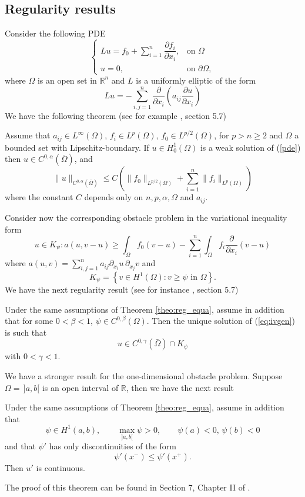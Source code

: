   \subsection*{Regularity results}
 Consider the following PDE
 \begin{equation}\label{pde}
 \begin{cases}
 Lu= f_0+\sum_{i=1}^n \dfrac{\partial f_i}{\partial x_i},& \text{on } \Omega\\
 u=0, & \text{on } \partial \Omega,
 \end{cases}
 \end{equation}
where $\Omega$ is an open set in $\mathbb{R}^n$ and $L$ is a uniformly elliptic of the form
$$
Lu=-\sum_{i,j=1}^n \dfrac{\partial }{\partial x_i}\left(a_{ij}\dfrac{\partial u}{\partial x_i}\right)
$$
We have the following theorem  (see for example \cite{rodrigues1987}, section 5.7)
\begin{theorem}\label{theo:reg_equa}
Assume that $a_{ij} \in L^\infty(\Omega)$, $f_i \in L^p(\Omega)$, $f_0 \in L^{p/2}(\Omega)$, for $p >n \geq 2$ and $\Omega$ a bounded set with Lipschitz-boundary. If $u \in H^1_0(\Omega)$ is a weak solution of (\ref{pde}) then $u \in C^{0,\alpha}(\bar\Omega)
$, and
$$
\|u\|_{ C^{0,\alpha}(\bar\Omega)}\leq C\left(\|f_0\|_{L^{p/2}(\Omega)}+\sum_{i=1}^n\|f_i\|_{L^p(\Omega)}\right)
$$
where the constant $C$ depends only on $n,p,\alpha,\Omega$ and $a_{ij}$.
\end{theorem}
Consider now the corresponding obstacle problem in the variational inequality form
\begin{equation} \label{eq:ivgen}
u\in K_\psi: a(u,v-u) \geq \int_{\Omega}f_0(v-u)-\sum_{i=1}^{n}\int_{\Omega}f_i\dfrac{\partial }{\partial x_i}(v-u)
\end{equation}
where $a(u,v)= \sum_{i,j=1}^n a_{ij}\partial_{x_i} u \,\partial_{x_j} v$ and
\begin{equation}
K_\psi= \left\{v \in H^1(\Omega): v \geq \psi \text{ in } \Omega \right\}.
\end{equation}
We have the next regularity result (see for instance \cite{rodrigues1987}, section 5.7)
\begin{theorem}\label{theo:reg_inequa}
Under the same assumptions of Theorem \ref{theo:reg_equa}, assume in addition that for some $0 < \beta <1$, $\psi \in C^{0,\beta}(\Omega)$. Then the unique solution of (\ref{eq:ivgen}) is such that $$
u \in  C^{0,\gamma}(\bar\Omega)\cap K_\psi
$$ with $0 < \gamma < 1$.
\end{theorem}

We have a stronger result for the one-dimensional obstacle problem. Suppose $\Omega=\,]a,b[$ is an open interval of $\mathbb{R}$, then we have the next result
\begin{theorem}\label{theo:uprime_1d_continuous}
Under the same assumptions of Theorem \ref{theo:reg_equa}, assume in addition that 
$$\psi \in H^1(a,b),\qquad \max_{]a,b[} \psi >0,\qquad \psi(a)<0,\,\psi(b)<0$$
and that $\psi'$ has only discontinuities of the form
$$\psi'(x^-)\leq \psi'(x^+).$$
Then $u'$ is continuous. 
\end{theorem}
The proof of this theorem can be found in Section 7, Chapter II of \cite{kinderlehrer1980}.